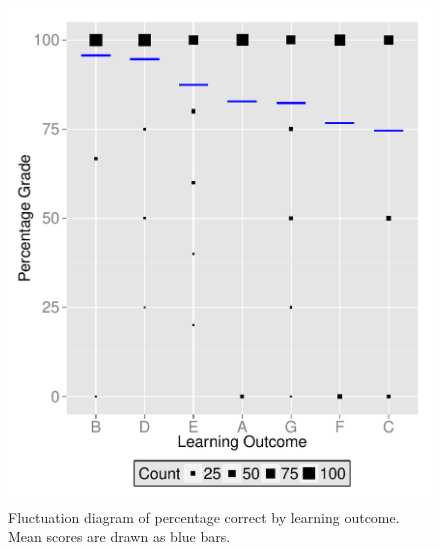 \documentclass[12pt,english,nohyper]{tufte-handout}\usepackage[]{graphicx}\usepackage[]{color}
\begin{document}
\vspace{5mm}

\begin{figure}[!ht]
\includegraphics[width=\linewidth]{Topic04_JKQ_LearningObj_boxplot.pdf}
\caption{Fluctuation diagram of percentage correct by learning outcome. Mean scores are drawn as blue bars.}
\label{fig:LearningObj_summary}
\end{figure}
\end{document}
